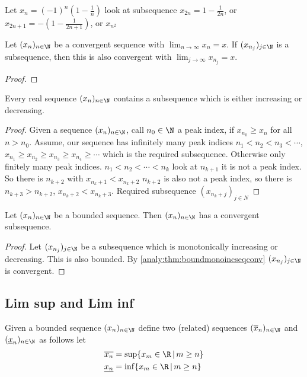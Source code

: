\documentclass[10pt, a4paper]{article}
\newcommand{\seq}[1][x]{(#1_n)_{n \in \N}}
\begin{document}
\begin{example}
    Let $x_n = (-1) ^ n\left(1 - \frac{1}{n}\right)$
    look at subsequence $x_{2n} = 1 - \frac{1}{2n}$,
    or $x_{2n + 1} = -\left(1 - \frac{1}{2n + 1}\right)$,
    or $x_{n ^ 2}$
\end{example}

\begin{proposition}
    Let $\seq$ be a convergent sequence with $\displaystyle\lim_{n \to \infty}x_n = x$.
    If $(x_{n_j})_{j \in \N}$ is a subsequence,
    then this is also convergent with $\displaystyle\lim_{j \to \infty}x_{n_j} = x$.
    \begin{proof}
        
    \end{proof}
\end{proposition}

\begin{lemma}
    Every real sequence $\seq$ contains a subsequence which is either increasing or decreasing.
    \begin{proof}
        Given a sequence $\seq$,
        call $n_0 \in \N$ a peak index,
        if $x_{n_0} \geq x_n$ for all $n > n_0$.
        Assume,
        our sequence has infinitely many peak indices
        $n_1 < n_2 < n_3 < \dotsi$,
        $x_{n_1} \geq x_{n_2} \geq x_{n_3} \geq x_{n_4} \geq \dotsi$ which is the required subsequence.
        Otherwise only finitely many peak indices.
        $n_1 < n_2 < \dotsi < n_k$ look at $n_{k + 1}$ it is not a peak index.
        So there is $n_{k + 2}$ with $x_{n_k + 1} < x_{n_k + 2}$
        $n_{k + 2}$ is also not a peak index,
        so there is $n_{k + 3} > n_{k + 2}$,
        $x_{n_k + 2} < x_{n_k + 3}$.
        Required subsequence $(x_{n_k + j})_{j \in N}$
    \end{proof}
\end{lemma}

\begin{theorem}\label{analy:thm:bolzanoweierstrass}
    Let $\seq$ be a bounded sequence.
    Then $\seq$ has a convergent subsequence.
    \begin{proof}
        Let $(x_{n_j})_{j \in \N}$ be a subsequence which is monotonically increasing or decreasing.
        This is also bounded.
        By \autoref{analy:thm:boundmonoincseqconv} $(x_{n_j})_{j \in \N}$ is convergent.
    \end{proof}
\end{theorem}

\subsection{Lim sup and Lim inf}
Given a bounded sequence $\seq$ define two
(related)
sequences $\seq[\overline{x}]$ and $\seq[\underline{x}]$ as follows let
\begin{align*}
    \overline{x_n} &= \sup\{x_m \in \R\,|\,m \geq n\} \\
    \underline{x_n} &= \inf\{x_m \in \R\,|\,m \geq n\}
\end{align*}
\end{document}
